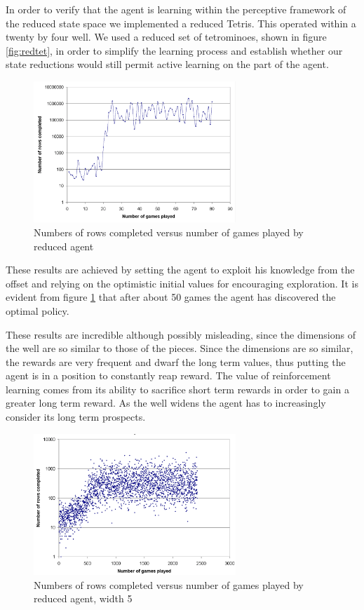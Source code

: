 \documentclass[a4paper,twocolumn]{article}
\begin{document}
In order to verify that the agent is learning within the perceptive framework of the reduced state space we implemented a reduced Tetris. This operated within a twenty by four well. We used a reduced set of tetrominoes, shown in figure \ref{fig:redtet}, in order to simplify the learning process and establish whether our state reductions would still permit active learning on the part of the agent. 

\begin{figure}[h]
\centering
\includegraphics[width=3in]{reducedresults.png}
\caption{Numbers of rows completed versus number of games played by reduced agent}
\label{fig:redgenius}
\end{figure}

These results are achieved by setting the agent to exploit his knowledge from the offset and relying on the optimistic initial values for encouraging exploration. It is evident from figure \ref{fig:redgenius} that after about 50 games the agent has discovered the optimal policy. 

These results are incredible although possibly misleading, since the dimensions of the well are so similar to those of the pieces. Since the dimensions are so similar, the rewards are very frequent and dwarf the long term values, thus putting the agent is in a position to constantly reap reward. The value of reinforcement learning comes from its ability to sacrifice short term rewards in order to gain a greater long term reward. As the well widens the agent has to increasingly consider its long term prospects.

\begin{figure}[h]
\centering
\includegraphics[width=3in]{width5results.png}
\caption{Numbers of rows completed versus number of games played by reduced agent, width 5}
\label{fig:5width}
\end{figure}
\end{document}
